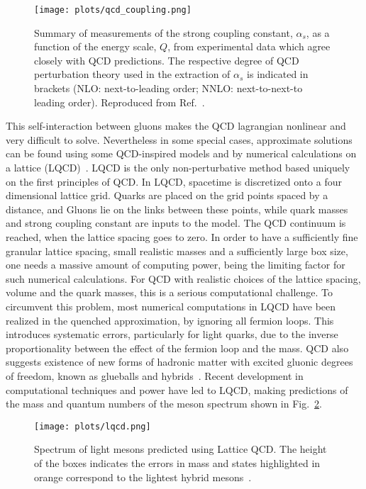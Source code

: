\begin{figure}[!t]
    \centering
        \texttt{[image: plots/qcd\_coupling.png]}
        \caption{Summary of measurements of the strong coupling constant, $\alpha_{s}$, as a function of the energy scale, $Q$, from experimental data which agree closely with QCD predictions. The respective degree of QCD perturbation theory used in the extraction of $\alpha_{s}$ is indicated in brackets (NLO: next-to-leading order; NNLO: next-to-next-to leading order). Reproduced from Ref.~\cite{Tanabashi18}.}
        \label{fig.1.1.2}
\end{figure}

This self-interaction between gluons makes the QCD lagrangian nonlinear and very difficult to solve. Nevertheless in some special cases, approximate solutions can be found using some QCD-inspired models and by numerical calculations on a lattice (LQCD)~\cite{Dudek13}. LQCD is the only non-perturbative method based uniquely on the first principles of QCD. In LQCD, spacetime is discretized onto a four dimensional lattice grid. Quarks are placed on the grid points spaced by a distance, and Gluons lie on the links between these points, while quark masses and strong coupling constant are inputs to the model. The QCD continuum is reached, when the lattice spacing goes to zero. In order to have a sufficiently fine granular lattice spacing, small realistic masses and a sufficiently large box size, one needs a massive amount of computing power, being the limiting factor for such numerical calculations. For QCD with realistic choices of the lattice spacing, volume and the quark masses, this is a serious computational challenge. To circumvent this problem, most numerical computations in LQCD have been realized in the quenched approximation, by ignoring all fermion loops. This introduces systematic errors, particularly for light quarks, due to the inverse proportionality between the effect of the fermion loop and the mass. QCD also suggests existence of new forms of hadronic matter with excited gluonic degrees of freedom, known as glueballs and hybrids~\cite{Tanabashi18}. Recent development in computational techniques and power have led to LQCD, making predictions of the mass and quantum numbers of the meson spectrum shown in Fig.~\ref{fig.1.1.3}.

\begin{landscape}
    \vspace*{\fill}
    \begin{figure}[H]
        \centering
        \texttt{[image: plots/lqcd.png]}
        \caption{Spectrum of light mesons predicted using Lattice QCD. The height of the boxes indicates the errors in mass and states highlighted in orange correspond to the lightest hybrid mesons~\cite{Dudek13}.}
        \label{fig.1.1.3}
    \end{figure}
    \vspace*{\fill}
\end{landscape}

